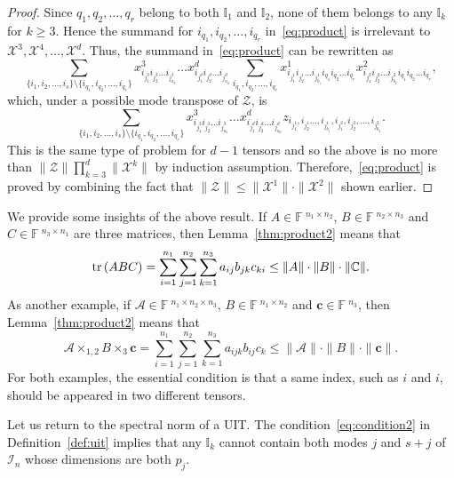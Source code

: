\documentclass[11pt]{article}
\newcommand{\C}{\mathbb{C}}
\newcommand{\BF}{\mathbb{F}\:\!}
\newcommand{\BI}{\mathbb{I}}
\newcommand{\X}{\mathcal{X}}
\newcommand{\Z}{\mathcal{Z}}
\newcommand{\II}{\mathcal{I}}
\newcommand{\A}{\mathcal{A}}
\newcommand{\bc}{\boldsymbol{c}}
\newcommand{\tr}{\textnormal{tr}\,}
\begin{document}
\begin{proof}
Since $q_1,q_2,\dots,q_r$ belong to both $\BI_1$ and $\BI_2$, none of them belongs to any $\BI_k$ for $k\ge3$. Hence the summand for $i_{q_1},i_{q_2},\dots,i_{q_r}$ in~\eqref{eq:product} is irrelevant to $\X^3,\X^4,\dots,\X^d$. Thus, the summand in~\eqref{eq:product} can be rewritten as
$$
\sum_{\{i_1,i_2,\dots,i_{s}\}\setminus\{i_{q_1},i_{q_2},\dots,i_{q_r}\}} x^{3}_{i_{j^3_1} i_{j^3_2}\dots i_{j^3_{a_3}}} \dots x^{d}_{i_{j^d_1} i_{j^d_2} \dots i_{j^d_{a_d}}} \sum_{i_{q_1},i_{q_2},\dots,i_{q_r}} x^{1}_{i_{j^1_1} i_{j^1_2} \dots i_{j^1_{b_1}} i_{q_1} i_{q_2} \dots i_{q_r}} x^{2}_{i_{j^2_1} i_{j^2_2} \dots i_{j^2_{b_2}} i_{q_1} i_{q_2} \dots i_{q_r}},
$$
which, under a possible mode transpose of $\Z$, is
$$
\sum_{\{i_1,i_2,\dots,i_{s}\}\setminus\{i_{q_1},i_{q_2},\dots,i_{q_r}\}}  x^{3}_{i_{j^3_1} i_{j^3_2}\dots i_{j^3_{a_3}}} \dots x^{d}_{i_{j^d_1} i_{j^d_2} \dots i_{j^d_{a_d}}} z_{i_{j^1_1}, i_{j^1_2}\dots,i_{j^1_{b_1}},i_{j^2_1},i_{j^2_2},\dots, i_{j^2_{b_2}}}.
$$
This is the same type of problem for $d-1$ tensors and so the above is no more than $\|\Z\|\prod_{k=3}^d\|\X^k\|$ by induction assumption. Therefore,~\eqref{eq:product} is proved by combining the fact that $\|\Z\|\le\|\X^1\|\cdot\|\X^2\|$ shown earlier.
\end{proof}

We provide some insights of the above result. If $A\in\BF^{n_1\times n_2}$, $B\in\BF^{n_2\times n_3}$ and $C\in\BF^{n_3\times n_1}$ are three matrices, then Lemma~\ref{thm:product2} means that
$$
\tr(ABC) = \sum_{i=1}^{n_1}\sum_{j=1}^{n_2}\sum_{k=1}^{n_3} a_{ij}b_{jk}c_{ki} \le \|A\|\cdot\|B\|\cdot\|\C\|.
$$
As another example, if $\A\in\BF^{n_1\times n_2\times n_3}$, $B\in\BF^{n_1\times n_2}$ and $\bc\in\BF^{n_3}$, then Lemma~\ref{thm:product2} means that
$$
\A\times_{1,2}B\times_3\bc = \sum_{i=1}^{n_1}\sum_{j=1}^{n_2}\sum_{k=1}^{n_3} a_{ijk}b_{ij}c_{k} \le \|\A\|\cdot\|B\|\cdot\|\bc\|.
$$
For both examples, the essential condition is that a same index, such as $i$ and $i$, should be appeared in two different tensors.

Let us return to the spectral norm of a UIT. The condition~\eqref{eq:condition2} in Definition~\ref{def:uit} implies that any $\BI_k$ cannot contain both modes $j$ and $s+j$ of $\II_n$ whose dimensions are both $p_j$.
\end{document}
